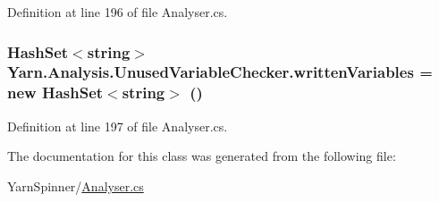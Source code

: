 Definition at line 196 of file Analyser.\-cs.

\hypertarget{a00175_a0c2fe6eded1b10b135ca2469f5980a39}{
\subsubsection[{written\-Variables}]{\setlength{\rightskip}{0pt plus 5cm}Hash\-Set$<$string$>$ Yarn.\-Analysis.\-Unused\-Variable\-Checker.\-written\-Variables = new Hash\-Set$<$string$>$ ()\hspace{0.3cm}{\ttfamily [private]}}}\label{a00175_a0c2fe6eded1b10b135ca2469f5980a39}


Definition at line 197 of file Analyser.\-cs.



The documentation for this class was generated from the following file\-:\begin{DoxyCompactItemize}
\item 
Yarn\-Spinner/\hyperlink{a00287}{Analyser.\-cs}\end{DoxyCompactItemize}
